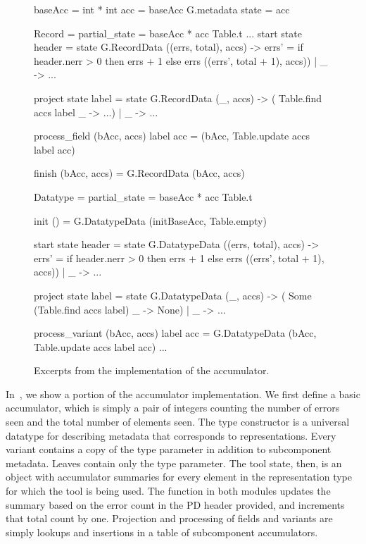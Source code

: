 \begin{figure}
\begin{code}\scriptsize
{} baseAcc = int * int
 acc = baseAcc G.metadata
 state = acc

 Record = 
   partial_state = baseAcc * acc Table.t
  ... 
   start state header =
     state 
      G.RecordData ((errs, total), accs) ->
	 errs' = if header.nerr > 0
                    then errs + 1 else errs
	 ((errs', total + 1), accs))
    | _ ->  ...
	  
   project state label =  state 
      G.RecordData (_, accs) -> ( Table.find accs label
                                  _ ->  ...)
    | _ ->  ...

   process_field (bAcc, accs) label acc =
    (bAcc, Table.update accs label acc)
      
   finish (bAcc, accs) = G.RecordData (bAcc, accs)
    
 Datatype = 
   partial_state = baseAcc * acc Table.t
	
   init () = G.DatatypeData (initBaseAcc, Table.empty)

   start state header = 
     state 
      G.DatatypeData ((errs, total), accs) ->
	 errs' = if header.nerr > 0
                    then errs + 1 else errs
	 ((errs', total + 1), accs))
    | _ ->  ...
	  
   project state label =  state 
    G.DatatypeData (_, accs) -> ( Some (Table.find accs label)
                                  _ -> None)
  | _ ->  ...
	  
   process_variant (bAcc, accs) label acc =
    G.DatatypeData (bAcc, Table.update accs label acc)
...
\end{code}
\caption{Excerpts from the implementation of the accumulator.}
\label{fig:gentool-accum-code}
\end{figure}

In~, we show a portion of the
accumulator implementation. We first define a basic accumulator, which
is simply a pair of integers counting the number of errors seen and
the total number of elements seen. The type constructor
 is a universal datatype for describing metadata that
corresponds to \padsml{} representations. Every variant contains a
copy of the type parameter in addition to subcomponent metadata.
Leaves contain only the type parameter. The tool state, then, is an
object with accumulator summaries for every element in the
representation type for which the tool is being used. The 
function in both modules updates the summary based on the error count
 in the PD header provided, and increments that total count
by one. Projection and processing of fields and variants are simply
lookups and insertions in a table of subcomponent accumulators.

